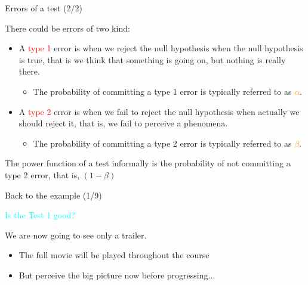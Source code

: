 \documentclass{beamer}
\begin{document}
\begin{frame}
{\centerline{Errors of a test (2/2)}}
There could be errors of two kind:
\begin{itemize}
\item A \textcolor{red}{type 1} error is when we reject the null hypothesis when the null hypothesis is true, that is we think that something is going on, but nothing is really there. 
\begin{itemize}
\item The probability of committing a type 1 error is typically referred to as \textcolor{orange}{$\alpha$}.
\end{itemize}

\item A \textcolor{red}{type 2} error is when we fail to reject the null hypothesis when actually we should reject it, that is, we fail to perceive a phenomena.
\begin{itemize}
\item The probability of committing a type 2 error is typically referred to as  \textcolor{orange}{$\beta$}. 
\end{itemize}
\end{itemize}


The power function of a test informally is the probability of not committing a type 2 error, that is, $(1-\beta)$

\end{frame}


\begin{frame}
{\centerline{Back to the example (1/9)}}

\begin{center}
\Large
\textcolor{cyan}{Is the Test 1 good?}
\end{center}

\vspace*{1cm}

\begin{center}
\Large
We are now going to see only a trailer.
\end{center}

\begin{itemize}
\item The full movie will be played throughout the course
\item But perceive the big picture now before progressing...

\end{itemize}

\end{frame}
\end{document}
